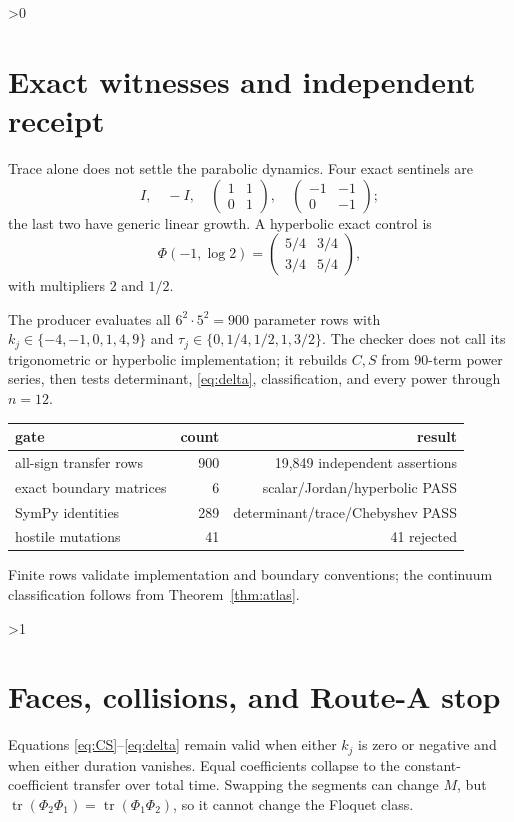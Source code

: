 \documentclass[10pt]{article}
\newcommand{\tr}{\operatorname{tr}}
\begin{document}
\ifnum\CRevisionRound>0
\section{Exact witnesses and independent receipt}
Trace alone does not settle the parabolic dynamics.  Four exact sentinels are
\[
 I,\quad -I,\quad
 \begin{pmatrix}1&1\\0&1\end{pmatrix},\quad
 \begin{pmatrix}-1&-1\\0&-1\end{pmatrix};              \label{eq:sentinels}
\]
the last two have generic linear growth.  A hyperbolic exact control is
\[
 \Phi(-1,\log2)=
 \begin{pmatrix}5/4&3/4\\3/4&5/4\end{pmatrix},
\]
with multipliers $2$ and $1/2$.

The producer evaluates all $6^2\cdot5^2=900$ parameter rows with
$k_j\in\{-4,-1,0,1,4,9\}$ and
$\tau_j\in\{0,1/4,1/2,1,3/2\}$.  The checker does not call its trigonometric
or hyperbolic implementation; it rebuilds $C,S$ from 90-term power series,
then tests determinant, \eqref{eq:delta}, classification, and every power
through $n=12$.
\begin{center}
\small
\begin{tabular}{lrr}
\toprule
gate & count & result\\
\midrule
all-sign transfer rows & 900 & 19,849 independent assertions\\
exact boundary matrices & 6 & scalar/Jordan/hyperbolic PASS\\
SymPy identities & 289 & determinant/trace/Chebyshev PASS\\
hostile mutations & 41 & 41 rejected\\
\bottomrule
\end{tabular}
\end{center}
Finite rows validate implementation and boundary conventions; the continuum
classification follows from Theorem~\ref{thm:atlas}.
\fi

\ifnum\CRevisionRound>1
\section{Faces, collisions, and Route-A stop}
Equations \eqref{eq:CS}--\eqref{eq:delta} remain valid when either $k_j$ is
zero or negative and when either duration vanishes.  Equal coefficients
collapse to the constant-coefficient transfer over total time.  Swapping the
segments can change $M$, but $\tr(\Phi_2\Phi_1)=\tr(\Phi_1\Phi_2)$, so it
cannot change the Floquet class.
\end{document}
